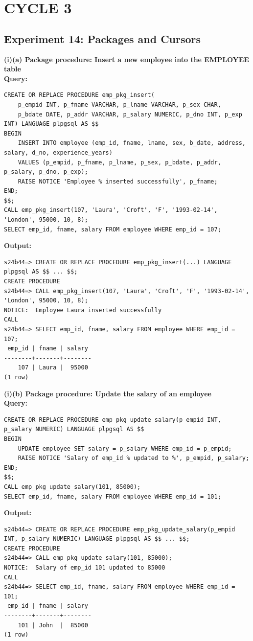 \documentclass[12pt, a4paper]{article}
\begin{document}
\newpage
\section*{CYCLE 3}

\subsection*{Experiment 14: Packages and Cursors}

\textbf{(i)(a) Package procedure: Insert a new employee into the EMPLOYEE table}\\
\textbf{Query:}
\begin{lstlisting}
CREATE OR REPLACE PROCEDURE emp_pkg_insert(
    p_empid INT, p_fname VARCHAR, p_lname VARCHAR, p_sex CHAR, 
    p_bdate DATE, p_addr VARCHAR, p_salary NUMERIC, p_dno INT, p_exp INT) LANGUAGE plpgsql AS $$
BEGIN
    INSERT INTO employee (emp_id, fname, lname, sex, b_date, address, salary, d_no, experience_years) 
    VALUES (p_empid, p_fname, p_lname, p_sex, p_bdate, p_addr, p_salary, p_dno, p_exp);
    RAISE NOTICE 'Employee % inserted successfully', p_fname;
END;
$$;
CALL emp_pkg_insert(107, 'Laura', 'Croft', 'F', '1993-02-14', 'London', 95000, 10, 8);
SELECT emp_id, fname, salary FROM employee WHERE emp_id = 107;
\end{lstlisting}
\textbf{Output:}
\begin{lstlisting}[style=terminal]
s24b44=> CREATE OR REPLACE PROCEDURE emp_pkg_insert(...) LANGUAGE plpgsql AS $$ ... $$;
CREATE PROCEDURE
s24b44=> CALL emp_pkg_insert(107, 'Laura', 'Croft', 'F', '1993-02-14', 'London', 95000, 10, 8);
NOTICE:  Employee Laura inserted successfully
CALL
s24b44=> SELECT emp_id, fname, salary FROM employee WHERE emp_id = 107;
 emp_id | fname | salary 
--------+-------+--------
    107 | Laura |  95000
(1 row)
\end{lstlisting}

\textbf{(i)(b) Package procedure: Update the salary of an employee}\\
\textbf{Query:}
\begin{lstlisting}
CREATE OR REPLACE PROCEDURE emp_pkg_update_salary(p_empid INT, p_salary NUMERIC) LANGUAGE plpgsql AS $$
BEGIN
    UPDATE employee SET salary = p_salary WHERE emp_id = p_empid;
    RAISE NOTICE 'Salary of emp_id % updated to %', p_empid, p_salary;
END;
$$;
CALL emp_pkg_update_salary(101, 85000);
SELECT emp_id, fname, salary FROM employee WHERE emp_id = 101;
\end{lstlisting}
\textbf{Output:}
\begin{lstlisting}[style=terminal]
s24b44=> CREATE OR REPLACE PROCEDURE emp_pkg_update_salary(p_empid INT, p_salary NUMERIC) LANGUAGE plpgsql AS $$ ... $$;
CREATE PROCEDURE
s24b44=> CALL emp_pkg_update_salary(101, 85000);
NOTICE:  Salary of emp_id 101 updated to 85000
CALL
s24b44=> SELECT emp_id, fname, salary FROM employee WHERE emp_id = 101;
 emp_id | fname | salary 
--------+-------+--------
    101 | John  |  85000
(1 row)
\end{lstlisting}
\end{document}
